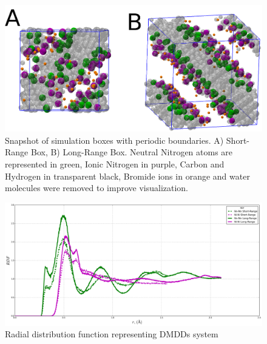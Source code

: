 \documentclass[10pt,a4paper,twoside]{article}
\begin{document}
\begin{figure}[H]
  \begin{center}
	\includegraphics[width=1 \textwidth]{./images/aa2}
	\caption{Snapshot of simulation boxes with periodic boundaries. A) Short-Range Box, B) Long-Range Box. Neutral Nitrogen atoms are represented in green, Ionic Nitrogen in purple, Carbon and Hydrogen in transparent black, Bromide ions in orange and water molecules were removed to improve visualization. }
	\label{Fig:aa2}
  \end{center}
\end{figure}

\begin{figure}[H]
  \begin{center}
	\includegraphics[width=1 \textwidth]{./graphs/rdfaa2}
	\caption{Radial distribution function representing DMDDs system}
	\label{Fig:rdfAA2}
  \end{center}
\end{figure}
\end{document}
